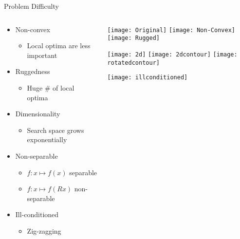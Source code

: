 \begin{frame}{Problem Difficulty}
  \begin{columns}
    \begin{column}{0.55\textwidth}
      \vspace*{-14pt}
      \begin{itemize}
        \item Non-convex
          \begin{itemize}
            \item Local optima are less important
          \end{itemize}
        \item Ruggedness
          \begin{itemize}
            \item Huge \# of local optima
          \end{itemize}
        \item Dimensionality
          \begin{itemize}
            \item Search space grows exponentially
          \end{itemize}
        \item Non-separable
          \begin{itemize}
            \item $f : x \mapsto f(x)$ separable
            \item $f : x \mapsto f(Rx)$ non-separable
          \end{itemize}
        \item Ill-conditioned
          \begin{itemize}
            \item Zig-zagging
          \end{itemize}
      \end{itemize}
    \end{column}
    \begin{column}{0.55\textwidth}
      \begin{minipage}[b]{1\textwidth}
      \texttt{[image: Original]}
      \texttt{[image: Non-Convex]}
      \texttt{[image: Rugged]}
    \end{minipage}
    \begin{minipage}[b]{1\textwidth}  
      \texttt{[image: 2d]}
      \texttt{[image: 2dcontour]}
      \texttt{[image: rotatedcontour]}
    \end{minipage}
    \begin{minipage}[b]{1\textwidth}
      \texttt{[image: illconditioned]}
    \end{minipage}
    \end{column}
  \end{columns}
\end{frame}
